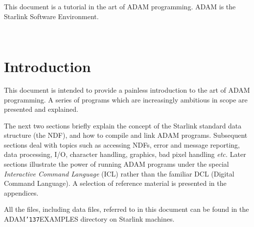 \documentclass[twoside,11pt]{article}
\newcommand{\stardocinitials}  {SUN}
\newcommand{\stardocnumber}    {101.2}
\newcommand{\stardocabstract}  {This document is a tutorial in the art
of ADAM programming.  ADAM is the Starlink Software Environment.}
\newcommand{\stardocname}{\stardocinitials /\stardocnumber}
\renewcommand{\_}{{\tt\char'137}}
\newenvironment{latexonly}{}{}
\newcommand{\xlabel}[1]{}
\renewcommand{\thepage}{\roman{page}}
\begin{document}
\stardocabstract
\newpage
\begin{latexonly}
   \setlength{\parskip}{0mm}
   \tableofcontents
   \setlength{\parskip}{\medskipamount}
   \markright{\stardocname}
\end{latexonly}
\newpage
~
\newpage

\renewcommand{\thepage}{\arabic{page}}
\setcounter{page}{1}

\section{Introduction\label{intro}\xlabel{introduction}}

This document is intended to provide a painless introduction to  the art
of ADAM programming.
A series of programs which are increasingly ambitious  in scope are 
presented and  explained.

The next  two sections briefly explain the 
concept of the Starlink standard data structure (the NDF), and
how to compile and link ADAM programs.
Subsequent sections deal with 
topics such as accessing  NDFs, error and message reporting, data processing,
I/O, character handling, graphics, 
bad pixel handling {\it etc.}
Later sections illustrate the power of running ADAM programs under the 
special {\sl Interactive Command Language} (ICL) rather than the familiar
DCL (Digital Command Language).
A selection of reference material is presented in the appendices.

All the files, including data files, referred to in this document can be 
found in the ADAM\_EXAMPLES directory on Starlink machines.
\end{document}
